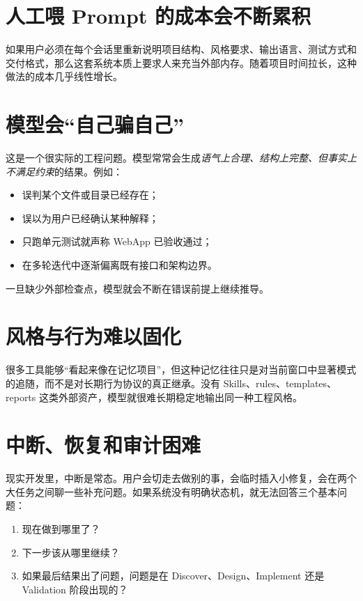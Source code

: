 \documentclass[
  outputdir=build,
  chapterstyle=cn,
  colorscheme=Simple,
  fontset=tech,
  code=false
]{Hypo-Note}
\begin{document}
\section{人工喂 Prompt 的成本会不断累积}

如果用户必须在每个会话里重新说明项目结构、风格要求、输出语言、测试方式和交付格式，那么这套系统本质上要求人来充当外部内存。随着项目时间拉长，这种做法的成本几乎线性增长。

\section{模型会“自己骗自己”}

这是一个很实际的工程问题。模型常常会生成\emph{语气上合理、结构上完整、但事实上不满足约束}的结果。例如：

\begin{itemize}[leftmargin=2em]
  \item 误判某个文件或目录已经存在；
  \item 误以为用户已经确认某种解释；
  \item 只跑单元测试就声称 WebApp 已验收通过；
  \item 在多轮迭代中逐渐偏离既有接口和架构边界。
\end{itemize}

一旦缺少外部检查点，模型就会不断在错误前提上继续推导。

\section{风格与行为难以固化}

很多工具能够“看起来像在记忆项目”，但这种记忆往往只是对当前窗口中显著模式的追随，而不是对长期行为协议的真正继承。没有 Skills、rules、templates、reports 这类外部资产，模型就很难长期稳定地输出同一种工程风格。

\section{中断、恢复和审计困难}

现实开发里，中断是常态。用户会切走去做别的事，会临时插入小修复，会在两个大任务之间聊一些补充问题。如果系统没有明确状态机，就无法回答三个基本问题：

\begin{enumerate}[leftmargin=2em]
  \item 现在做到哪里了？
  \item 下一步该从哪里继续？
  \item 如果最后结果出了问题，问题是在 Discover、Design、Implement 还是 Validation 阶段出现的？
\end{enumerate}
\end{document}
